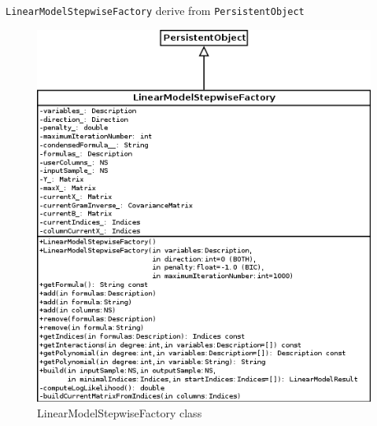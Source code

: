 \texttt{LinearModelStepwiseFactory} derive from \texttt{PersistentObject}
\begin{figure}[htb]
  \begin{center}
    \includegraphics[scale=0.5]{LinearModelStepwiseFactory.png}
    \caption{LinearModelStepwiseFactory class}\label{fig:archi:LinearModelStepwiseFactory}
  \end{center}
\end{figure}
